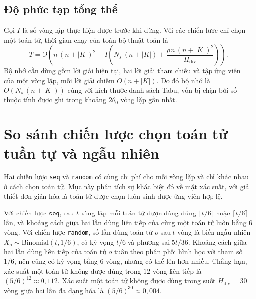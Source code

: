 \documentclass[../DoAn.tex]{subfiles}
\begin{document}
\subsection{Độ phức tạp tổng thể}

Gọi $I$ là số vòng lặp thực hiện được trước khi dừng. Với các chiến lược chỉ chọn một toán tử, thời gian chạy của toàn bộ thuật toán là
\begin{equation}
T = O\!\left(n\,(n + |K|)^2 + I\left(N_s\,(n + |K|) + \frac{\rho\, n\,(n + |K|)^2}{H_{\text{div}}}\right)\right).
\end{equation}
Bộ nhớ cần dùng gồm lời giải hiện tại, hai lời giải tham chiếu và tập ứng viên của một vòng lặp, mỗi lời giải chiếm $O(n + |K|)$. Do đó bộ nhớ là $O(N_s\,(n + |K|))$ cùng với kích thước danh sách Tabu, vốn bị chặn bởi số thuộc tính được ghi trong khoảng $2\theta_0$ vòng lặp gần nhất.

\section{So sánh chiến lược chọn toán tử tuần tự và ngẫu nhiên}
\label{sec:seqrand}

Hai chiến lược \texttt{seq} và \texttt{random} có cùng chi phí cho mỗi vòng lặp và chỉ khác nhau ở cách chọn toán tử. Mục này phân tích sự khác biệt đó về mặt xác suất, với giả thiết đơn giản hóa là toán tử được chọn luôn sinh được ứng viên hợp lệ.

Với chiến lược \texttt{seq}, sau $t$ vòng lặp mỗi toán tử được dùng đúng $\lfloor t/6 \rfloor$ hoặc $\lceil t/6 \rceil$ lần, và khoảng cách giữa hai lần dùng liên tiếp của cùng một toán tử luôn bằng $6$ vòng. Với chiến lược \texttt{random}, số lần dùng toán tử $o$ sau $t$ vòng là biến ngẫu nhiên $X_o \sim \mathrm{Binomial}(t, 1/6)$, có kỳ vọng $t/6$ và phương sai $5t/36$. Khoảng cách giữa hai lần dùng liên tiếp của toán tử $o$ tuân theo phân phối hình học với tham số $1/6$, nên cũng có kỳ vọng bằng $6$ vòng, nhưng có thể lớn hơn nhiều. Chẳng hạn, xác suất một toán tử không được dùng trong $12$ vòng liên tiếp là $(5/6)^{12} \approx 0{,}112$. Xác suất một toán tử không được dùng trong suốt $H_{\text{div}} = 30$ vòng giữa hai lần đa dạng hóa là $(5/6)^{30} \approx 0{,}004$.
\end{document}
